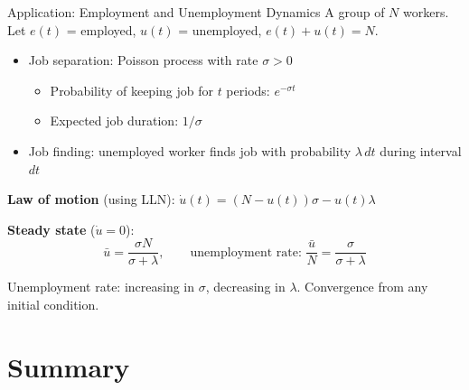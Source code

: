 \documentclass[blue]{beamer}
\begin{document}
\begin{frame}{Application: Employment and Unemployment Dynamics}
	A group of $N$ workers. Let $e(t)$ = employed, $u(t)$ = unemployed, $e(t) + u(t) = N$.
	
	\begin{itemize}
		\item Job separation: Poisson process with rate $\sigma > 0$
		\begin{itemize}
			\item Probability of keeping job for $t$ periods: $e^{-\sigma t}$
			\item Expected job duration: $1/\sigma$
		\end{itemize}
		\item Job finding: unemployed worker finds job with probability $\lambda\, dt$ during interval $dt$
	\end{itemize}
	
	\bigskip
	\textbf{Law of motion} (using LLN): $\dot{u}(t) = (N - u(t))\sigma - u(t) \lambda$
	
	\textbf{Steady state} ($\dot{u} = 0$):
	\[
	\bar{u} = \frac{\sigma N}{\sigma + \lambda}, \qquad \text{unemployment rate: } \frac{\bar{u}}{N} = \frac{\sigma}{\sigma + \lambda}
	\]
	
	Unemployment rate: increasing in $\sigma$, decreasing in $\lambda$. Convergence from any initial condition. 
\end{frame}


\section{Summary}
\end{document}
